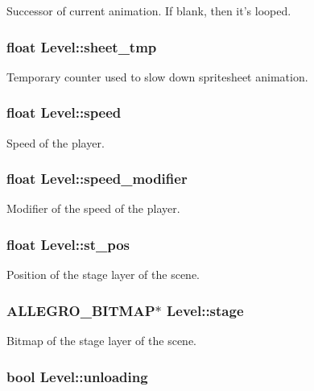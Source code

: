 Successor of current animation. If blank, then it's looped. \hypertarget{structLevel_a22e80ea91fd267dae85c0457e581d072}{
\subsubsection[{sheet\-\_\-tmp}]{\setlength{\rightskip}{0pt plus 5cm}float Level\-::sheet\-\_\-tmp}}\label{structLevel_a22e80ea91fd267dae85c0457e581d072}
Temporary counter used to slow down spritesheet animation. \hypertarget{structLevel_a936a1d131d1e056878474ca831c5e88f}{
\subsubsection[{speed}]{\setlength{\rightskip}{0pt plus 5cm}float Level\-::speed}}\label{structLevel_a936a1d131d1e056878474ca831c5e88f}
Speed of the player. \hypertarget{structLevel_a0f6fa70a2e0b85437dc1973d1409381f}{
\subsubsection[{speed\-\_\-modifier}]{\setlength{\rightskip}{0pt plus 5cm}float Level\-::speed\-\_\-modifier}}\label{structLevel_a0f6fa70a2e0b85437dc1973d1409381f}
Modifier of the speed of the player. \hypertarget{structLevel_ab13f799d9e2e06a04debbd97676fb512}{
\subsubsection[{st\-\_\-pos}]{\setlength{\rightskip}{0pt plus 5cm}float Level\-::st\-\_\-pos}}\label{structLevel_ab13f799d9e2e06a04debbd97676fb512}
Position of the stage layer of the scene. \hypertarget{structLevel_ad412b858a4e688114dd89a44ecb005bb}{
\subsubsection[{stage}]{\setlength{\rightskip}{0pt plus 5cm}A\-L\-L\-E\-G\-R\-O\-\_\-\-B\-I\-T\-M\-A\-P$\ast$ Level\-::stage}}\label{structLevel_ad412b858a4e688114dd89a44ecb005bb}
Bitmap of the stage layer of the scene. \hypertarget{structLevel_a058680deb984491fa71d2f212f8025ae}{
\subsubsection[{unloading}]{\setlength{\rightskip}{0pt plus 5cm}bool Level\-::unloading}}\label{structLevel_a058680deb984491fa71d2f212f8025ae}

